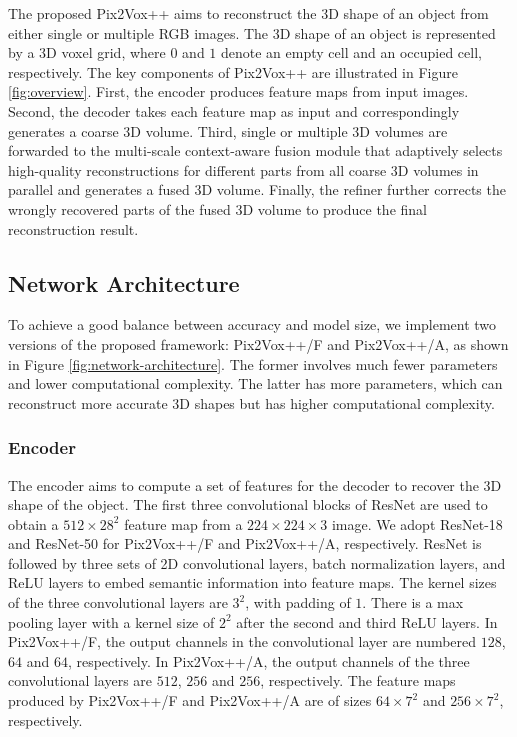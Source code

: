 \documentclass[twocolumn]{svjour3}
\begin{document}
The proposed Pix2Vox++ aims to reconstruct the 3D shape of an object from either single or multiple RGB images. 
The 3D shape of an object is represented by a 3D voxel grid, where $0$ and $1$ denote an empty cell and an occupied cell, respectively.
The key components of Pix2Vox++ are illustrated in Figure \ref{fig:overview}.
First, the encoder produces feature maps from input images.
Second, the decoder takes each feature map as input and correspondingly generates a coarse 3D volume.
Third, single or multiple 3D volumes are forwarded to the multi-scale context-aware fusion module that adaptively selects high-quality reconstructions for different parts from all coarse 3D volumes in parallel and generates a fused 3D volume.
Finally, the refiner further corrects the wrongly recovered parts of the fused 3D volume to produce the final reconstruction result.

\subsection{Network Architecture}

To achieve a good balance between accuracy and model size, we implement two versions of the proposed framework: Pix2Vox++/F and Pix2Vox++/A, as shown in Figure \ref{fig:network-architecture}.
The former involves much fewer parameters and lower computational complexity.
The latter has more parameters, which can reconstruct more accurate 3D shapes but has higher computational complexity.

\subsubsection{Encoder}

The encoder aims to compute a set of features for the decoder to recover the 3D shape of the object.
The first three convolutional blocks of ResNet \citep{DBLP:conf/cvpr/HeZRS16} are used to obtain a $512 \times 28^2$ feature map from a $224 \times 224 \times 3$ image.
We adopt ResNet-18 and ResNet-50 for Pix2Vox++/F and Pix2Vox++/A, respectively.
ResNet is followed by three sets of 2D convolutional layers, batch normalization layers, and ReLU layers to embed semantic information into feature maps.
The kernel sizes of the three convolutional layers are $3^2$, with padding of $1$.
There is a max pooling layer with a kernel size of $2^2$ after the second and third ReLU layers.
In Pix2Vox++/F, the output channels in the convolutional layer are numbered $128$, $64$ and $64$, respectively.
In Pix2Vox++/A, the output channels of the three convolutional layers are $512$, $256$ and $256$, respectively.
The feature maps produced by Pix2Vox++/F and Pix2Vox++/A are of sizes $64 \times 7^2$ and $256 \times 7^2$, respectively.
\end{document}
